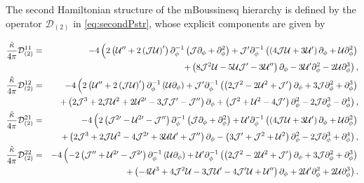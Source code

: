 \documentclass[letterpaper,11pt,oneside]{book}
\begin{document}
The second Hamiltonian structure of the mBoussinesq hierarchy is defined
by the operator $\mathcal{D}_{\left(2\right)}$ in \eqref{eq:secondPstr},
whose explicit components are given by

\begin{eqnarray*}
	\frac{\hat{\kappa}}{4\pi}\mathcal{D}_{(2)}^{11} & = & -4\left(2\left({\cal U}^{\prime\prime}+2\left({\cal J}{\cal U}\right)^{\prime}\right)\partial_{\phi}^{-1}\left({\cal J}\partial_{\phi}+\partial_{\phi}^{2}\right)+{\cal J}^{\prime}\partial_{\phi}^{-1}\left(\left(4{\cal J}\mathcal{U}+3\mathcal{U}^{\prime}\right)\partial_{\phi}+\mathcal{U}\partial_{\phi}^{2}\right)\right.\\
	&  & \left.+\left(8{\cal J}^{2}\mathcal{U}-5{\cal U}\mathcal{J}^{\prime}-3{\cal U}^{\prime\prime}\right)\partial_{\phi}-3\mathcal{U}^{\prime}\partial_{\phi}^{2}-2{\cal U}\partial_{\phi}^{3}\right),\\
	\frac{\hat{\kappa}}{4\pi}\mathcal{D}_{(2)}^{12} & = & -4\left(2\left({\cal U}^{\prime\prime}+2\left({\cal J}{\cal U}\right)^{\prime}\right)\partial_{\phi}^{-1}\left({\cal U}\partial_{\phi}\right)+{\cal J}^{\prime}\partial_{\phi}^{-1}\left(\left(2\mathcal{J}^{2}-2\mathcal{U}^{2}+\mathcal{J}^{\prime}\right)\partial_{\phi}+3\mathcal{J}\partial_{\phi}^{2}+\partial_{\phi}^{3}\right)\right.\\
	&  & \left.+\left(2{\cal J}^{3}+2{\cal J}\mathcal{U}^{2}+2{\cal U}^{2\prime}-3{\cal J}{\cal J}^{\prime}-{\cal J}^{\prime\prime}\right)\partial_{\phi}+\left(\mathcal{J}^{2}+\mathcal{U}^{2}-4\mathcal{J}^{\prime}\right)\partial_{\phi}^{2}-2{\cal J}\partial_{\phi}^{3}-\partial_{\phi}^{4}\right),\\
	\frac{\hat{\kappa}}{4\pi}\mathcal{D}_{(2)}^{21} & = & -4\left(2\left({\cal J}^{2\prime}-{\cal U}^{2\prime}-{\cal J}^{\prime\prime}\right)\partial_{\phi}^{-1}\left({\cal J}\partial_{\phi}+\partial_{\phi}^{2}\right)+{\cal U}^{\prime}\partial_{\phi}^{-1}\left(\left(4{\cal J}\mathcal{U}+3\mathcal{U}^{\prime}\right)\partial_{\phi}+\mathcal{U}\partial_{\phi}^{2}\right)\right.\\
	&  & \left.+\left(2{\cal J}^{3}+2{\cal J}\mathcal{U}^{2}-4{\cal J}^{2\prime}+3{\cal U}{\cal U}^{\prime}+{\cal J}^{\prime\prime}\right)\partial_{\phi}-\left(3\mathcal{J}^{\prime}+\mathcal{J}^{2}+\mathcal{U}^{2}\right)\partial_{\phi}^{2}-2{\cal J}\partial_{\phi}^{3}+\partial_{\phi}^{4}\right),\\
	\frac{\hat{\kappa}}{4\pi}\mathcal{D}_{(2)}^{22} & = & -4\left(-2\left({\cal J}^{\prime\prime}+{\cal U}^{2\prime}-{\cal J}^{2\prime}\right)\partial_{\phi}^{-1}\left({\cal U}\partial_{\phi}\right)+{\cal U}^{\prime}\partial_{\phi}^{-1}\left(\left(2\mathcal{J}^{2}-2\mathcal{U}^{2}+\mathcal{J}^{\prime}\right)\partial_{\phi}+3\mathcal{J}\partial_{\phi}^{2}+\partial_{\phi}^{3}\right)\right.\\
	&  & \left.+\left(-4\mathcal{U}^{3}+4{\cal J}^{2}\mathcal{U}-3{\cal J}{\cal U}^{\prime}-4{\cal J}^{\prime}{\cal U}+{\cal U}^{\prime\prime}\right)\partial_{\phi}+2\mathcal{U}^{\prime}\partial_{\phi}^{2}+2{\cal U}\partial_{\phi}^{3}\right).
\end{eqnarray*}
\end{document}
